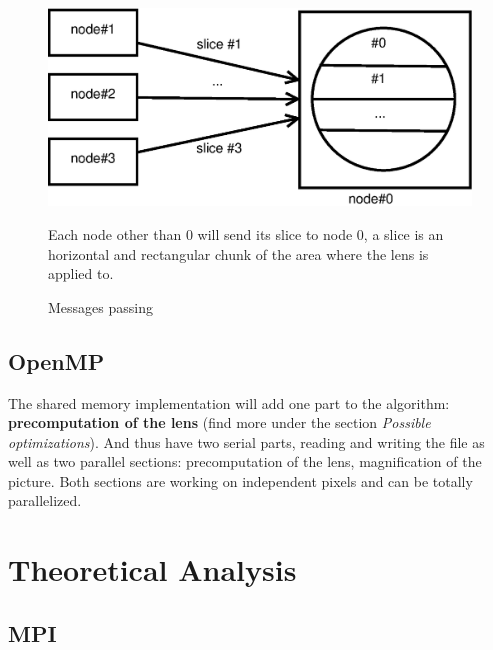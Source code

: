\documentclass[10pt,a4paper]{article}
\begin{document}
\begin{figure}[h]
    \centering
    \includegraphics[width=0.5\linewidth]{../figures/slices.eps}
    \caption{Messages passing}{\small Each node other than $0$ will send its
    slice to node $0$, a slice is an horizontal and rectangular chunk of the
    area where the lens is applied to.}
    \label{fig:slices}
\end{figure}

\subsection{OpenMP}
The shared memory implementation will add one part to the algorithm:
\textbf{precomputation of the lens} (find more under the section \emph{Possible
optimizations}). And thus have two serial parts, reading and writing the file
as well as two parallel sections: precomputation of the lens, magnification of
the picture. Both sections are working on independent pixels and can be
totally parallelized.

\section{Theoretical Analysis}

\subsection{MPI}
\end{document}
